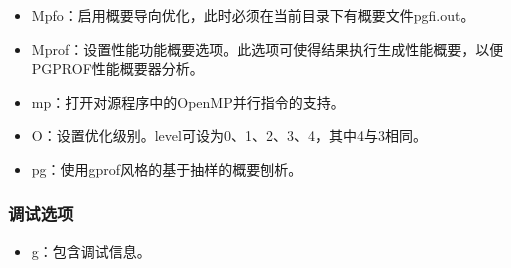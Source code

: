 \documentclass[a4paper,12pt,english]{sphinxmanual}
\begin{document}
\begin{itemize}
\item {} 
\sphinxAtStartPar
\sphinxhyphen{}Mpfo：启用概要导向优化，此时必须在当前目录下有概要文件pgfi.out。

\item {} 
\sphinxAtStartPar
\sphinxhyphen{}Mprof\sphinxstyleemphasis{{[}=option{[},option,…{]}{]}}：设置性能功能概要选项。此选项可使得结果执行生成性能概要，以便PGPROF性能概要器分析。

\item {} 
\sphinxAtStartPar
\sphinxhyphen{}mp\sphinxstyleemphasis{{[}=option{]}}：打开对源程序中的OpenMP并行指令的支持。

\item {} 
\sphinxAtStartPar
\sphinxhyphen{}O\sphinxstyleemphasis{{[}level{]}}：设置优化级别。level可设为0、1、2、3、4，其中4与3相同。

\item {} 
\sphinxAtStartPar
\sphinxhyphen{}pg：使用gprof风格的基于抽样的概要刨析。

\end{itemize}


\subsubsection{调试选项}
\label{\detokenize{compiler/pgi:id7}}\begin{itemize}
\item {} 
\sphinxAtStartPar
\sphinxhyphen{}g：包含调试信息。

\end{itemize}
\end{document}
